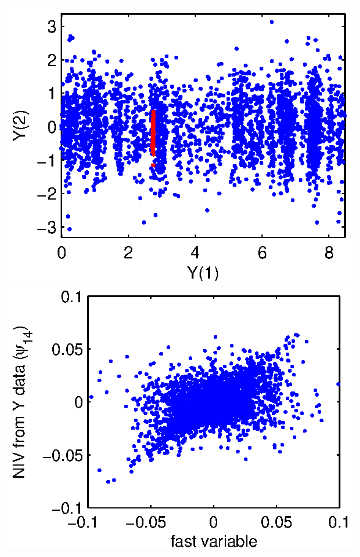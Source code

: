\documentclass[1p]{elsarticle}
\begin{document}
\begin{figure}[h]
\begin{subfigure}{0.3\textwidth}
\caption{}
\end{subfigure}
\begin{subfigure}{0.3\textwidth}
\includegraphics[width=\textwidth]{data_withburst_2}
\includegraphics[width=\textwidth]{fast_var_corr_2}
\caption{}
\end{subfigure}
\begin{subfigure}{0.3\textwidth}

\end{subfigure}
\end{figure}
\end{document}
